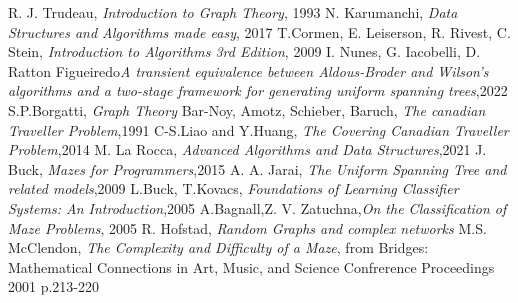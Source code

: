 
\begin{thebibliography}{100}

R. J. Trudeau, \emph{Introduction to Graph Theory}, 1993
N. Karumanchi, \emph{Data Structures and Algorithms made easy}, 2017
T.Cormen, E. Leiserson, R. Rivest, C. Stein, \emph{Introduction to Algorithms 3rd Edition}, 2009
I. Nunes, G. Iacobelli, D. Ratton Figueiredo\emph{A transient equivalence between Aldous-Broder and Wilson's algorithms and a two-stage framework for generating uniform spanning trees},2022
S.P.Borgatti, \emph{Graph Theory}
Bar-Noy, Amotz, Schieber, Baruch, \emph{The canadian Traveller Problem},1991
C-S.Liao and Y.Huang, \emph{The Covering Canadian Traveller Problem},2014
M. La Rocca, \emph{Advanced Algorithms and Data Structures},2021 
J. Buck, \emph{Mazes for Programmers},2015
A. A. Jarai, \emph{The Uniform Spanning Tree and related models},2009
L.Buck, T.Kovacs, \emph{Foundations of Learning Classifier Systems: An Introduction},2005
A.Bagnall,Z. V. Zatuchna,\emph{On the Classification of Maze Problems}, 2005
R. Hofstad, \emph{Random Graphs and complex networks}
M.S. McClendon, \emph{The Complexity and Difficulty of a Maze}, from Bridges: Mathematical Connections in Art, Music, and Science Confrerence Proceedings 2001 p.213-220


\end{thebibliography}
